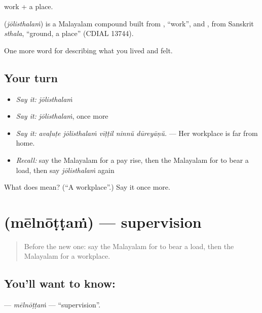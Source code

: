  work +  a place.

\begin{cousinweb}
\textbf{} (\emph{jōlisthalaṁ}) is a Malayalam compound built from , \textquotedblleft{}work\textquotedblright{}, and , from Sanskrit \emph{sthala}, \textquotedblleft{}ground, a place\textquotedblright{} (CDIAL 13744).
\end{cousinweb}

\begin{grammarlens}[title={What you've built}]
One more word for describing what you lived and felt.
\end{grammarlens}

\subsection*{Your turn}
\begin{itemize}
\raggedright
  \item \emph{Say it:} \emph{jōlisthalaṁ}
  \item \emph{Say it:} \emph{jōlisthalaṁ}, once more
  \item \emph{Say it:} \emph{avaḷuṭe jōlisthalaṁ vīṭṭil ninnŭ dūreyāṇŭ.} — Her workplace is far from home.
  \item \emph{Recall:} say the Malayalam for a pay rise, then the Malayalam for to bear a load, then say \emph{jōlisthalaṁ} again
\end{itemize}

\begin{tcolorbox}[breakable,colback=teal!4,colframe=teal!35!black,title={Before you move on}]
What does  mean? (\textquotedblleft{}A workplace\textquotedblright{}.) Say it once more.
\end{tcolorbox}
\section[\texorpdfstring{\ml{മേൽനോട്ടം} (mēlnōṭṭaṁ)}{മേൽനോട്ടം (mēlnōṭṭaṁ)}]{ (mēlnōṭṭaṁ) — supervision}

\label{lesson:ML-C550-melnottam}



\begin{quote}
Before the new one: say the Malayalam for to bear a load, then the Malayalam for a workplace.
\end{quote}

\subsection*{You'll want to know: }
\textbf{} — \emph{mēlnōṭṭaṁ} — \textquotedblleft{}supervision\textquotedblright{}.


